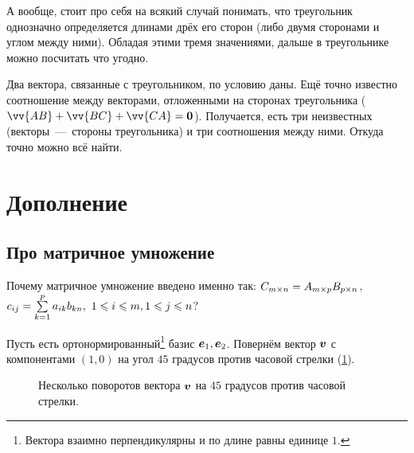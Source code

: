 \documentclass[a4paper,12pt]{article}
\begin{document}
\begin{solution}
    А вообще, стоит про себя на всякий случай понимать, что треугольник однозначно определяется длинами дрёх его сторон (либо двумя сторонами и углом между ними).
    Обладая этими тремя значениями, дальше в треугольнике можно посчитать что угодно.
    
    Два вектора, связанные с треугольником, по условию даны.
    Ещё точно известно соотношение между векторами, отложенными на сторонах треугольника ($\vv{AB} \hm+ \vv{BC} \hm+ \vv{CA} \hm= \bds 0$).
    Получается, есть три неизвестных (векторы~---~стороны треугольника) и три соотношения между ними.
    Откуда точно можно всё найти.
  \end{solution}
  
  
  \section{Дополнение}
  
  \subsection{Про матричное умножение}
  
  Почему матричное умножение введено именно так: $C_{m\times n} \hm= A_{m\times p}B_{p\times n}$, $c_{ij} \hm= \sum\limits_{k=1}^p a_{ik} b_{kn},\ 1 \hm\leq i \hm\leq m, 1 \hm\leq j \hm\leq n$?
  
  Пусть есть ортонормированный\footnote{Вектора взаимно перпендикулярны и по длине равны единице $1$.} базис $\boldsymbol e_1, \boldsymbol e_2$.
  Повернём вектор $\boldsymbol v$ с компонентами $(1, 0)$ на угол $45$ градусов против часовой стрелки (\ref{fig:turning-vector}).
  
  \begin{figure}[h]
    \centering
    
    
    \caption{Несколько поворотов вектора $\boldsymbol v$ на $45$ градусов против часовой стрелки.}
    \label{fig:turning-vector}
  \end{figure}
  
\end{document}
